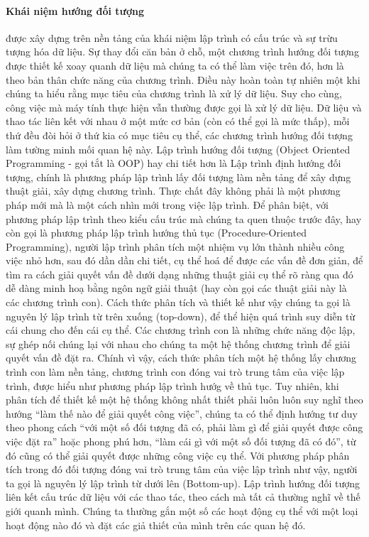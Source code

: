 {{\paragraph{Khái niệm hướng đối tượng \cite{book:oop} } được xây dựng trên nền tảng của khái niệm lập trình có cấu trúc và sự trừu tượng hóa dữ liệu. Sự thay đổi căn bản ở chỗ, một chương trình hướng đối tượng được thiết kế xoay quanh dữ liệu mà chúng ta có thể làm việc trên đó, hơn là theo bản thân chức năng của chương trình. Điều này hoàn toàn tự nhiên một khi chúng ta hiểu rằng mục tiêu của chương trình là xử lý dữ liệu. Suy cho cùng, công việc mà máy tính thực hiện vẫn thường được gọi là xử lý dữ liệu. Dữ liệu và thao tác liên kết với nhau ở một mức cơ bản (còn có thể gọi là mức thấp), mỗi thứ đều đòi hỏi ở thứ kia có mục tiêu cụ thể, các chương trình hướng đối tượng làm tường minh mối quan hệ này. Lập trình hướng đối tượng (Object Oriented Programming - gọi tắt là OOP) hay chi tiết hơn là Lập trình định hướng đối tượng, chính là phương pháp lập trình lấy đối tượng làm nền tảng để xây dựng thuật giải, xây dựng chương trình. Thực chất đây không phải là một phương pháp mới mà là một cách nhìn mới trong việc lập trình. Để phân biệt, với phương pháp lập trình theo kiểu cấu trúc mà chúng ta quen thuộc trước đây, hay còn gọi là phương pháp lập trình hướng thủ tục (Procedure-Oriented Programming), người lập trình phân tích một nhiệm vụ lớn thành nhiều công việc nhỏ hơn, sau đó dần dần chi tiết, cụ thể hoá để được các vấn đề đơn giản, để tìm ra cách giải quyết vấn đề dưới dạng những thuật giải cụ thể rõ ràng qua đó dễ dàng minh hoạ bằng ngôn ngữ giải thuật (hay còn gọi các thuật giải này là các chương trình con). Cách thức phân tích và thiết kế như vậy chúng ta gọi là nguyên lý lập trình từ trên xuống (top-down), để thể hiện quá trình suy diễn từ cái chung cho đến cái cụ thể. Các chương trình con là những chức năng độc lập, sự ghép nối chúng lại với nhau cho chúng ta một hệ thống chương trình để giải quyết vấn đề đặt ra. Chính vì vậy, cách thức phân tích một hệ thống lấy chương trình con làm nền tảng, chương trình con đóng vai trò trung tâm của việc lập trình, được hiểu như phương pháp lập trình hướg về thủ tục. Tuy nhiên, khi phân tích để thiết kế một hệ thống không nhất thiết phải luôn luôn suy nghĩ theo hướng “làm thế nào để giải quyết công việc”, chúng ta có thể định hướng tư duy theo phong cách “với một số đối tượng đã có, phải làm gì để giải quyết được công việc đặt ra” hoặc phong phú hơn, “làm cái gì với một số đối tượng đã có đó”, từ đó cũng có thể giải quyết được những công việc cụ thể. Với phương pháp phân tích trong đó đối tượng đóng vai trò trung tâm của việc lập trình như vậy, người ta gọi là nguyên lý lập trình từ dưới lên (Bottom-up). Lập trình hướng đối tượng liên kết cấu trúc dữ liệu với các thao tác, theo cách mà tất cả thường nghĩ về thế giới quanh mình. Chúng ta thường gắn một số các hoạt động cụ thể với một loại hoạt động nào đó và đặt các giả thiết của mình trên các quan hệ đó. 

}}
